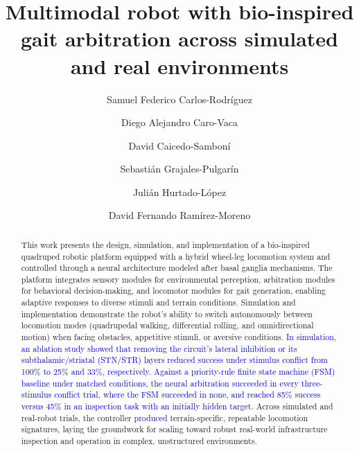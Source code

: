 \documentclass[preprint,12pt]{elsarticle}
\newcommand{\revblue}[1]{\textcolor{blue}{#1}}
\begin{document}
\begin{frontmatter}

\title{Multimodal robot with bio-inspired gait arbitration across simulated and real environments} %

\author{Samuel Federico Carlos-Rodríguez}
\author{Diego Alejandro Caro-Vaca}
\author{David Caicedo-Samboní}
\author{Sebastián Grajales-Pulgarín}
\author{Julián Hurtado-López}
\author{David Fernando Ramírez-Moreno}



\begin{abstract}
This work presents the design, simulation, and implementation of a bio-inspired quadruped robotic platform equipped with a hybrid wheel-leg locomotion system and controlled through a neural architecture modeled after basal ganglia mechanisms. The platform integrates sensory modules for environmental perception, arbitration modules for behavioral decision-making, and locomotor modules for gait generation, enabling adaptive responses to diverse stimuli and terrain conditions. Simulation and implementation demonstrate the robot's ability to switch autonomously between locomotion modes (quadrupedal walking, differential rolling, and omnidirectional motion) when facing obstacles, appetitive stimuli, or aversive conditions. \revblue{In simulation, an ablation study showed that removing the circuit's lateral inhibition or its subthalamic/striatal (STN/STR) layers reduced success under stimulus conflict from 100\% to 25\% and 33\%, respectively. Against a priority-rule finite state machine (FSM) baseline under matched conditions, the neural arbitration succeeded in every three-stimulus conflict trial, where the FSM succeeded in none, and reached 85\% success versus 45\% in an inspection task with an initially hidden target.} Across simulated and real-robot trials, the controller \revblue{produced} terrain-specific, repeatable locomotion signatures, laying the groundwork for scaling toward robust real-world infrastructure inspection and operation in complex, unstructured environments.
\end{abstract}


\end{frontmatter}
\end{document}

